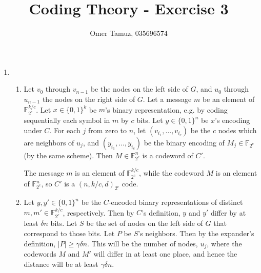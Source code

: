 \documentclass[11pt]{article} \usepackage{amssymb}
\begin{document}
\title{Coding Theory - Exercise 3}

 \author{Omer Tamuz, 035696574}
\maketitle

\begin{enumerate}
\item 
  \begin{enumerate}
  \item Let $v_0$ through $v_{n-1}$ be the nodes on the left side of $G$,
  and $u_0$ through $u_{n-1}$ the nodes on the right side of $G$. 
  Let a message $m$ be an element of $\mathbb{F}_{2^c}^{k/c}$.
  Let $x\in \{0,1\}^k$ be $m$'s binary representation, e.g. by coding
  sequentially each symbol in $m$ by $c$ bits.
  Let $y\in \{0,1\}^n$ be $x$'s encoding under $C$.
  For each $j$ from zero to $n$, 
  let $(v_{i_1},\ldots,v_{i_c})$ be the $c$ nodes which are neighbors 
  of $u_j$, and $(y_{i_1},\ldots,y_{i_c})$ be the binary
  encoding of $M_j\in \mathbb{F}_{2^c}$ (by the same scheme). Then $M\in \mathbb{F}_{2^c}^n$
  is a codeword of $C'$. 

  The message $m$ is an element of 
  $\mathbb{F}_{2^c}^{k/c}$, while the codeword $M$ is an element of
  $\mathbb{F}_{2^c}^n$, so $C'$ is a $(n,k/c,d)_{2^c}$ code.

  \item
  Let $y,y'\in \{0,1\}^n$ be the $C$-encoded binary representations of 
  distinct $m,m'\in \mathbb{F}_{2^c}^{k/c}$, respectively. Then by $C$'s definition, $y$ and $y'$
  differ by at least $\delta n$ bits. Let $S$ be the set of nodes on the left
  side of $G$ that correspond to those bits. Let $P$ be $S$'s neighbors.
  Then by the expander's definition, $|P|\geq\gamma\delta n$. This will be the number
  of nodes, $u_j$, where the codewords $M$ and $M'$ will differ in at
  least one place, and hence the distance will be at least $\gamma\delta n$.
  

\end{enumerate}
\end{enumerate}
\end{document}
